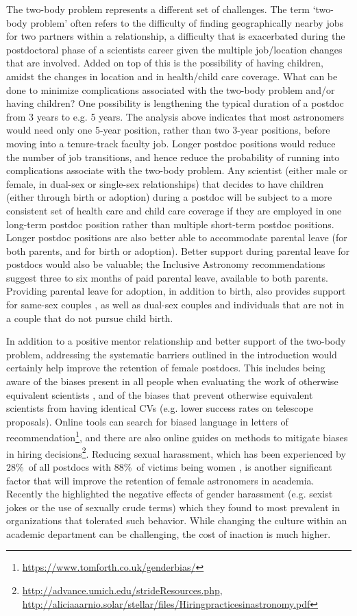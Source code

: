 \documentclass[modern]{aastex62}
\begin{document}
The two-body problem represents a different set of challenges. The term `two-body problem' often refers to the difficulty of finding geographically nearby jobs for two partners within a relationship, a difficulty that is exacerbated during the postdoctoral phase of a scientists career given the multiple job/location changes that are involved. Added on top of this is the possibility of having children, amidst the changes in location and in health/child care coverage. What can be done to minimize complications associated with the two-body problem and/or having children? One possibility is lengthening the typical duration of a postdoc from 3 years to e.g. 5 years. The analysis above indicates that most astronomers would need only one 5-year position, rather than two 3-year positions, before moving into a tenure-track faculty job. Longer postdoc positions would reduce the number of job transitions, and hence reduce the probability of running into complications associate with the two-body problem. Any scientist (either male or female, in dual-sex or single-sex relationships) that decides to have children (either through birth or adoption) during a postdoc will be subject to a more consistent set of health care and child care coverage if they are employed in one long-term postdoc position rather than multiple short-term postdoc positions. Longer postdoc positions are also better able to accommodate parental leave (for both parents, and for birth or adoption). Better support during parental leave for postdocs would also be valuable; the Inclusive Astronomy recommendations suggest three to six months of paid parental leave, available to both parents. Providing parental leave for adoption, in addition to birth, also provides support for same-sex couples \citep{ath16}, as well as dual-sex couples and individuals that are not in a couple that do not pursue child birth.

In addition to a positive mentor relationship and better support of the two-body problem, addressing the systematic barriers outlined in the introduction would certainly help improve the retention of female postdocs. This includes being aware of the biases present in all people when evaluating the work of otherwise equivalent scientists \citep{ste99,mos12,riv17}, and of the biases that prevent otherwise equivalent scientists from having identical CVs (e.g. lower success rates on telescope proposals). Online tools can search for biased language in letters of recommendation\footnote{\url{https://www.tomforth.co.uk/genderbias/}}, and there are also online guides on methods to mitigate biases in hiring decisions\footnote{\url{http://advance.umich.edu/strideResources.php}, \url{http://aliciaaarnio.solar/stellar/files/Hiringpracticesinastronomy.pdf}}. Reducing sexual harassment, which has been experienced by 28\%\ of all postdocs with 88\%\ of victims being women \citep{sle17}, is another significant factor that will improve the retention of female astronomers in academia. Recently the \citet{nat18} highlighted the negative effects of gender harassment (e.g. sexist jokes or the use of sexually crude terms) which they found to most prevalent in organizations that tolerated such behavior. While changing the culture within an academic department can be challenging, the cost of inaction is much higher. 
\end{document}

